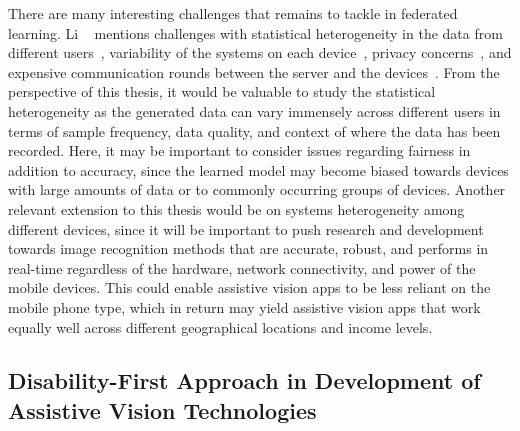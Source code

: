 There are many interesting challenges that remains to tackle in federated learning. Li \etal~\cite{li2020federated} mentions challenges with statistical heterogeneity in the data from different users~\cite{smith2017federated, zhao2018federated, li2020federated}, variability of the systems on each device~\cite{bonawitz2019towards}, privacy concerns~\cite{geyer2017differentially, bhowmick2018protection}, and expensive communication rounds between the server and the devices~\cite{konevcny2016federated}. From the perspective of this thesis, it would be valuable to study the statistical heterogeneity as the generated data can vary immensely across different users in terms of sample frequency, data quality, and context of where the data has been recorded. Here, it may be important to consider issues regarding fairness in addition to accuracy, since the learned model may become biased towards devices with large amounts of data or to commonly occurring groups of devices. Another relevant extension to this thesis would be on systems heterogeneity among different devices, since it will be important to push research and development towards image recognition methods that are accurate, robust, and performs in real-time regardless of the hardware, network connectivity, and power of the mobile devices. This could enable assistive vision apps to be less reliant on the mobile phone type, which in return may yield assistive vision apps that work equally well across different geographical locations and income levels. 



\subsection{Disability-First Approach in Development of Assistive Vision Technologies}


